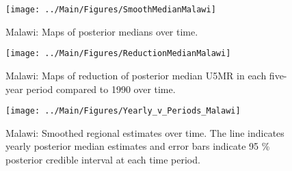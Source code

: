 \documentclass[12pt]{article}\usepackage[]{graphicx}\usepackage[]{color}
\newenvironment{knitrout}{}{} %
\begin{document}
\begin{knitrout}
\color{fgcolor}\begin{figure}[bht]

{\centering \texttt{[image: ../Main/Figures/SmoothMedianMalawi]} 

}

\caption[Malawi]{Malawi: Maps of posterior medians over time.}\label{fig:unnamed-chunk-204}
\end{figure}


\end{knitrout}
\begin{knitrout}
\color{fgcolor}\begin{figure}[bht]

{\centering \texttt{[image: ../Main/Figures/ReductionMedianMalawi]} 

}

\caption[Malawi]{Malawi: Maps of reduction of posterior median U5MR in each five-year period compared to 1990 over time.}\label{fig:unnamed-chunk-205}
\end{figure}


\end{knitrout}
\begin{knitrout}
\color{fgcolor}\begin{figure}[bht]

{\centering \texttt{[image: ../Main/Figures/Yearly\_v\_Periods\_Malawi]} 

}

\caption[Malawi]{Malawi: Smoothed regional estimates over time. The line indicates yearly posterior median estimates and error bars indicate 95 \% posterior credible interval at each time period.}\label{fig:unnamed-chunk-206}
\end{figure}


\end{knitrout}
\end{document}
